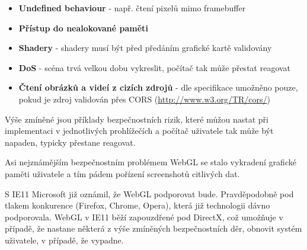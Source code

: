 \documentclass[12pt,a4paper,titlepage,final]{report}
\begin{document}
\begin{itemize}
	\item \textbf{Undefined behaviour} - např. čtení pixelů mimo framebuffer
	\item \textbf{Přístup do nealokované paměti}
	\item \textbf{Shadery} - shadery musí být před předáním grafické kartě validovány
	\item \textbf{DoS} - scéna trvá velkou dobu vykreslit, počítač tak může přestat reagovat
	\item \textbf{Čtení obrázků a videí z cizích zdrojů} - dle specifikace umožněno pouze, pokud je zdroj validován přes CORS (\url{http://www.w3.org/TR/cors/})
\end{itemize}

Výše zmíněné jsou příklady bezpečnostních rizik, které můžou nastat při implementaci v jednotlivých prohlížečích a počítač uživatele tak může být napaden, typicky přestane reagovat.

Asi nejznámějším bezpečnostním problémem WebGL se stalo vykradení grafické paměti uživatele a tím pádem pořízení screenshotů citlivých dat.

S IE11 Microsoft již oznámil, že WebGL podporovat bude. Pravděpodobně pod tlakem konkurence (Firefox, Chrome, Opera), která již technologii dávno podporovala. WebGL v IE11 běží zapouzdřené pod DirectX, což umožňuje v případě, že nastane některá z výše zmíněných bezpečnostních děr, obnovit systém uživatele, v případě, že vypadne.
	



\nocite{cite1}
\nocite{cite2}
\nocite{cite3}
\nocite{cite4}
\nocite{cite5}
\nocite{cite6}
\nocite{cite7}
\nocite{cite8}
\nocite{cite9}
\nocite{cite10}
\nocite{cite11}
\nocite{cite12}
\nocite{cite13}


\hypertarget{bib}{}

\end{document}
